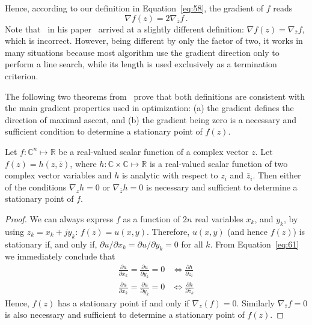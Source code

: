 Hence, according to our definition in Equation~\eqref{eq:58}, the
gradient of $f$ reads
\begin{equation}
  \label{eq:59}
  \nabla f(z) = 2 \nabla_{\bar{z}}f \,.
\end{equation}
Note that~\citeauthor{brandwood83complex} in his
paper~\citeyear{brandwood83complex} arrived at a 
slightly different definition: $\nabla f(z) = \nabla_{\bar{z}}f$,
which is incorrect. However, being different by only the factor
of two, it works in many situations because most algorithm use the
gradient direction only to perform a line search, while its length is used
exclusively as a termination criterion. 

The following two theorems from~ prove
that  both definitions are consistent with the main gradient
properties used in optimization: (a) the gradient defines the
direction of maximal ascent, and (b) the gradient being zero is a
necessary and sufficient condition to determine a stationary point of
$f(z)$.

\begin{thm}
  \label{thm:optimizatoin-stationary}
  Let $f:\mathbb C^{n} \mapsto \mathbb R$ be a real-valued scalar
  function of a complex vector $z$. Let $f(z) = h(z, \bar{z})$, where
  $h: \mathbb C \times \mathbb C \mapsto \mathbb R$ is a real-valued
  scalar function of two complex vector variables and $h$ is analytic
  with respect to $z_{i}$ and $\bar{z}_{i}$. Then either of the
  conditions $\nabla_{z}h=0$ or $\nabla_{\bar{z}}h=0$ is necessary and
  sufficient to determine a stationary point of $f$.
\end{thm}
\begin{proof}[Proof]
  We can always express $f$ as a function of $2n$ real variables
  $x_{k}$, and $y_{k}$, by using $z_{k}=x_{k}+jy_{k}$:  $f(z) =
  u(x,y)$. Therefore, $u(x,y)$ (and hence $f(z)$) is stationary if,
  and only if, $\partial u/\partial x_{k} = \partial
  u/\partial y_{k} = 0$ for all $k$. From Equation~\eqref{eq:61} we immediately
  conclude that
  \begin{equation}
    \label{eq:62}
    \begin{split}
      \frac{\partial u}{\partial x_{k}} =  \frac{\partial u}{\partial y_{k}}
      = 0 
      & \Leftrightarrow \frac{\partial h}{\partial z_{i}}\\
      \frac{\partial u}{\partial x_{k}} =  \frac{\partial u}{\partial y_{k}}
      = 0 
      & \Leftrightarrow \frac{\partial h}{\partial \bar z_{k}}
    \end{split}
  \end{equation}
  Hence, $f(z)$ has a stationary point if and only if $\nabla_{z}(f) =
  0$. Similarly $\nabla_{\bar z}f=0$ is also necessary and sufficient
  to determine a stationary point of $f(z)$.
\end{proof}

